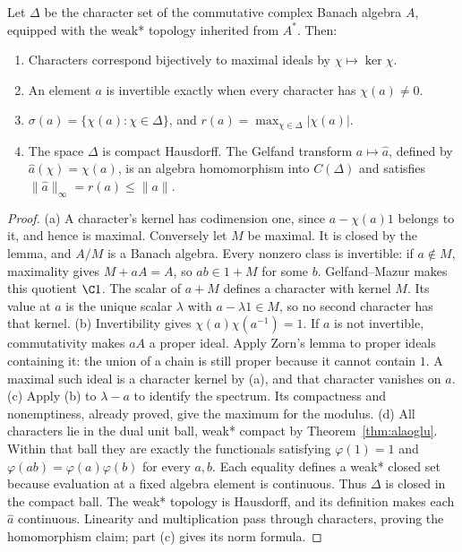 \begin{theorem}[Gelfand, 1941]\label{thm:gelfand}
Let $\Delta$ be the character set of the commutative complex Banach algebra $A$, equipped with the weak* topology inherited from $A^*$. Then:
\begin{enumerate}
\item[(a)] Characters correspond bijectively to maximal ideals by $\chi\mapsto\ker\chi$.
\item[(b)] An element $a$ is invertible exactly when every character has $\chi(a)\ne0$.
\item[(c)] $\sigma(a)=\{\chi(a):\chi\in\Delta\}$, and $r(a)=\max_{\chi\in\Delta}|\chi(a)|$.
\item[(d)] The space $\Delta$ is compact Hausdorff. The Gelfand transform $a\mapsto\hat a$, defined by $\hat a(\chi)=\chi(a)$, is an algebra homomorphism into $C(\Delta)$ and satisfies $\|\hat a\|_\infty=r(a)\le\|a\|$.
\end{enumerate}
\end{theorem}
\begin{proof}
(a) A character's kernel has codimension one, since $a-\chi(a)1$ belongs to it, and hence is maximal. Conversely let $M$ be maximal. It is closed by the lemma, and $A/M$ is a Banach algebra. Every nonzero class is invertible: if $a\notin M$, maximality gives $M+aA=A$, so $ab\in1+M$ for some $b$. Gelfand--Mazur makes this quotient $\C1$. The scalar of $a+M$ defines a character with kernel $M$. Its value at $a$ is the unique scalar $\lambda$ with $a-\lambda1\in M$, so no second character has that kernel.
(b) Invertibility gives $\chi(a)\chi(a^{-1})=1$. If $a$ is not invertible, commutativity makes $aA$ a proper ideal. Apply Zorn's lemma to proper ideals containing it: the union of a chain is still proper because it cannot contain $1$. A maximal such ideal is a character kernel by (a), and that character vanishes on $a$.
(c) Apply (b) to $\lambda-a$ to identify the spectrum. Its compactness and nonemptiness, already proved, give the maximum for the modulus.
(d) All characters lie in the dual unit ball, weak* compact by Theorem~\ref{thm:alaoglu}. Within that ball they are exactly the functionals satisfying $\varphi(1)=1$ and $\varphi(ab)=\varphi(a)\varphi(b)$ for every $a,b$. Each equality defines a weak* closed set because evaluation at a fixed algebra element is continuous. Thus $\Delta$ is closed in the compact ball. The weak* topology is Hausdorff, and its definition makes each $\hat a$ continuous. Linearity and multiplication pass through characters, proving the homomorphism claim; part (c) gives its norm formula.
\end{proof}

